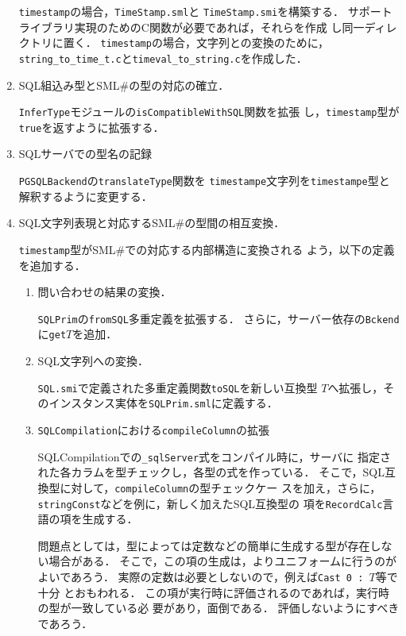 \documentclass{jbook}
\newcommand{\smlsharp}{SML\#}
\newcommand{\code}[1]{\mbox{\large\tt #1}}
\begin{document}
\begin{enumerate}
	\code{timestamp}の場合，\code{TimeStamp.sml}と
\code{TimeStamp.smi}を構築する．
	サポートライブラリ実現のためのC関数が必要であれば，それらを作成
し同一ディレクトリに置く．
	\code{timestamp}の場合，文字列との変換のために，
\code{string\_to\_time\_t.c}と\code{timeval\_to\_string.c}を作成した．

\item SQL組込み型と\smlsharp{}の型の対応の確立．

	\code{InferType}モジュールの\code{isCompatibleWithSQL}関数を拡張
し，\code{timestamp}型が\code{true}を返すように拡張する．

\item SQLサーバでの型名の記録

	\code{PGSQLBackend}の\code{translateType}関数を
\code{timestampe}文字列を\code{timestampe}型と解釈するように変更する．

\item SQL文字列表現と対応する\smlsharp{}の型間の相互変換．

	\code{timestamp}型が\smlsharp{}での対応する内部構造に変換される
よう，以下の定義を追加する．
\begin{enumerate}
\item 問い合わせの結果の変換．

	\code{SQLPrim}の\code{fromSQL}多重定義を拡張する．
	さらに，サーバー依存の\code{Bckend}に\code{get$T$}を追加．

\item SQL文字列への変換．

	\code{SQL.smi}で定義された多重定義関数\code{toSQL}を新しい互換型
$T$へ拡張し，そのインスタンス実体を\code{SQLPrim.sml}に定義する．

\item \code{SQLCompilation}における\code{compileColumn}の拡張

	
	SQLCompilationでの\code{\_sqlServer}式をコンパイル時に，サーバに
指定された各カラムを型チェックし，各型の式を作っている．
	そこで，SQL互換型に対して，\code{compileColumn}の型チェックケー
スを加え，さらに，\code{stringConst}などを例に，新しく加えたSQL互換型の
項を\code{RecordCalc}言語の項を生成する．
	
	問題点としては，型によっては定数などの簡単に生成する型が存在しな
い場合がある．
	そこで，この項の生成は，よりユニフォームに行うのがよいであろう．
	実際の定数は必要としないので，例えば\code{Cast 0 : $T$}等で十分
とおもわれる．
	この項が実行時に評価されるのであれば，実行時の型が一致している必
要があり，面倒である．
	評価しないようにすべきであろう．
\end{enumerate}
\end{enumerate}
\end{document}
